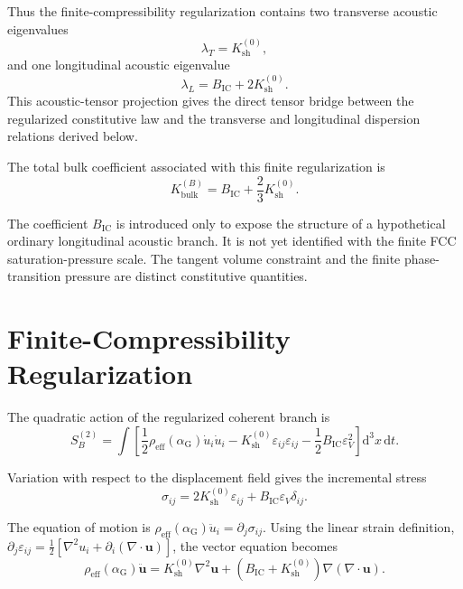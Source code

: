 Thus the finite-compressibility regularization contains two transverse acoustic eigenvalues
\begin{equation}
    \lambda_T
    =
    K_{\mathrm{sh}}^{(0)},
\end{equation}
and one longitudinal acoustic eigenvalue
\begin{equation}
    \lambda_L
    =
    B_{\mathrm{IC}}
    +
    2K_{\mathrm{sh}}^{(0)}.
\end{equation}
This acoustic-tensor projection gives the direct tensor bridge between the regularized constitutive law and the transverse and longitudinal dispersion relations derived below.

The total bulk coefficient associated with this finite regularization is
\begin{equation}
    K_{\mathrm{bulk}}^{(B)} = B_{\mathrm{IC}} + \frac{2}{3} K_{\mathrm{sh}}^{(0)}.
\end{equation}

The coefficient $B_{\mathrm{IC}}$ is introduced only to expose the structure of a hypothetical ordinary longitudinal acoustic branch. It is not yet identified with the finite FCC saturation-pressure scale. The tangent volume constraint and the finite phase-transition pressure are distinct constitutive quantities.

\section{Finite-Compressibility Regularization}

The quadratic action of the regularized coherent branch is
\begin{equation}
    S_B^{(2)} = \int \left[ \frac{1}{2} \rho_{\mathrm{eff}}(\alpha_{\mathrm{G}}) \dot{u}_i\dot{u}_i - K_{\mathrm{sh}}^{(0)} \varepsilon_{ij}\varepsilon_{ij} - \frac{1}{2} B_{\mathrm{IC}} \varepsilon_V^2 \right] \mathrm{d}^3x \, \mathrm{d}t.
\end{equation}

Variation with respect to the displacement field gives the incremental stress
\begin{equation}
    \sigma_{ij} = 2K_{\mathrm{sh}}^{(0)} \varepsilon_{ij} + B_{\mathrm{IC}} \varepsilon_V\delta_{ij}.
\end{equation}

The equation of motion is $\rho_{\mathrm{eff}}(\alpha_{\mathrm{G}}) \ddot{u}_i = \partial_j\sigma_{ij}$. Using the linear strain definition, $\partial_j\varepsilon_{ij} = \frac{1}{2} \left[ \nabla^2u_i + \partial_i(\nabla\cdot\mathbf{u}) \right]$, the vector equation becomes
\begin{equation}
    \rho_{\mathrm{eff}}(\alpha_{\mathrm{G}}) \ddot{\mathbf{u}} = K_{\mathrm{sh}}^{(0)} \nabla^2\mathbf{u} + \left( B_{\mathrm{IC}} + K_{\mathrm{sh}}^{(0)} \right) \nabla(\nabla\cdot\mathbf{u}).
\end{equation}

